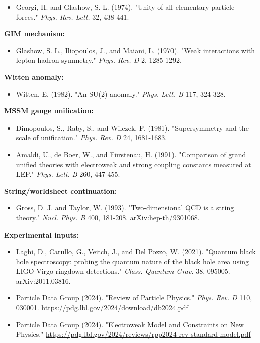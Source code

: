 \begin{itemize}
\tightlist
\item
  Georgi, H. and Glashow, S. L. (1974). "Unity of all elementary-particle forces." \emph{Phys. Rev. Lett.} 32, 438-441.
\end{itemize}

\textbf{GIM mechanism:}

\begin{itemize}
\tightlist
\item
  Glashow, S. L., Iliopoulos, J., and Maiani, L. (1970). "Weak interactions with lepton-hadron symmetry." \emph{Phys. Rev. D} 2, 1285-1292.
\end{itemize}

\textbf{Witten anomaly:}

\begin{itemize}
\tightlist
\item
  Witten, E. (1982). "An SU(2) anomaly." \emph{Phys. Lett. B} 117, 324-328.
\end{itemize}

\textbf{MSSM gauge unification:}

\begin{itemize}
\tightlist
\item
  Dimopoulos, S., Raby, S., and Wilczek, F. (1981). "Supersymmetry and the scale of unification." \emph{Phys. Rev. D} 24, 1681-1683.
\item
  Amaldi, U., de Boer, W., and F\"{u}rstenau, H. (1991). "Comparison of grand unified theories with electroweak and strong coupling constants measured at LEP." \emph{Phys. Lett. B} 260, 447-455.
\end{itemize}

\textbf{String/worldsheet continuation:}

\begin{itemize}
\tightlist
\item
  Gross, D. J. and Taylor, W. (1993). "Two-dimensional QCD is a string theory." \emph{Nucl. Phys. B} 400, 181-208. arXiv:hep-th/9301068.
\end{itemize}

\textbf{Experimental inputs:}

\begin{itemize}
\tightlist
\item
  Laghi, D., Carullo, G., Veitch, J., and Del Pozzo, W. (2021). "Quantum black hole spectroscopy: probing the quantum nature of the black hole area using LIGO-Virgo ringdown detections." \emph{Class. Quantum Grav.} 38, 095005. arXiv:2011.03816.
\item
  Particle Data Group (2024). "Review of Particle Physics." \emph{Phys. Rev. D} 110, 030001. \url{https://pdg.lbl.gov/2024/download/db2024.pdf}
\item
  Particle Data Group (2024). "Electroweak Model and Constraints on New Physics." \url{https://pdg.lbl.gov/2024/reviews/rpp2024-rev-standard-model.pdf}
\end{itemize}
\fi
